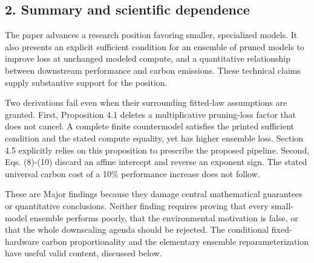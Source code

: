 \documentclass[10pt]{article}
\begin{document}
\subsection*{2. Summary and scientific dependence}
The paper advances a research position favoring smaller, specialized models. It also presents an explicit sufficient condition for an ensemble of pruned models to improve loss at unchanged modeled compute, and a quantitative relationship between downstream performance and carbon emissions. These technical claims supply substantive support for the position.\par
Two derivations fail even when their surrounding fitted-law assumptions are granted. First, Proposition 4.1 deletes a multiplicative pruning-loss factor that does not cancel. A complete finite countermodel satisfies the printed sufficient condition and the stated compute equality, yet has higher ensemble loss. Section 4.5 explicitly relies on this proposition to prescribe the proposed pipeline. Second, Eqs. (8)-(10) discard an affine intercept and reverse an exponent sign. The stated universal carbon cost of a 10\% performance increase does not follow.\par
These are Major findings because they damage central mathematical guarantees or quantitative conclusions. Neither finding requires proving that every small-model ensemble performs poorly, that the environmental motivation is false, or that the whole downscaling agenda should be rejected. The conditional fixed-hardware carbon proportionality and the elementary ensemble reparameterization have useful valid content, discussed below.\par
\end{document}

